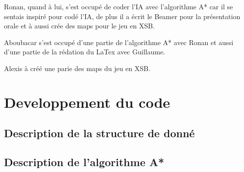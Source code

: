 \documentclass[a4paper,12pt]{article} %
\begin{document}
Ronan, quand à lui, s'est occupé de coder l'IA avec l'algorithme A* car il se sentais inspiré pour codé l'IA, de plus il a écrit le Beamer pour la présentation orale et à aussi crée des maps pour le jeu en XSB.

Aboubacar s'est occupé d'une partie de l'algorithme A* avec Ronan et aussi d'une partie de la rédation du LaTex avec Guillaume.

Alexis à créé une parie des maps du jeu en XSB.

\newpage

\section{Developpement du code}

\subsection{Description de la structure de donné}

\subsection{Description de l'algorithme A*}
\end{document}
